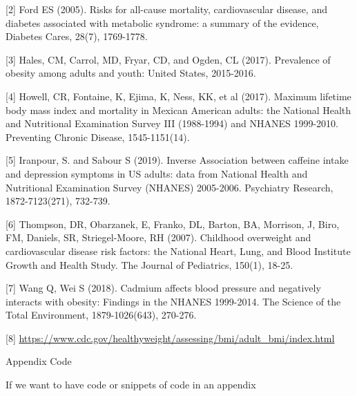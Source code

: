 \documentclass[12pt]{article}
\numberwithin{figure}{section}
\begin{document}
[2] Ford ES (2005). Risks for all-cause mortality, cardiovascular disease, and diabetes associated with metabolic syndrome: a summary of the evidence, Diabetes Cares, 28(7), 1769-1778.

[3] Hales, CM, Carrol, MD, Fryar, CD, and Ogden, CL (2017). Prevalence of obesity among adults and youth: United States, 2015-2016.

[4] Howell, CR, Fontaine, K, Ejima, K, Ness, KK, et al (2017). Maximum lifetime body mass index and mortality in Mexican American adults: the National Health and Nutritional Examination Survey III (1988-1994) and NHANES 1999-2010. Preventing Chronic Disease, 1545-1151(14).

[5] Iranpour, S. and Sabour S (2019). Inverse Association between caffeine intake and depression symptoms in US adults: data from National Health and Nutritional Examination Survey (NHANES) 2005-2006. Psychiatry Research, 1872-7123(271), 732-739.

[6] Thompson, DR, Obarzanek, E, Franko, DL, Barton, BA, Morrison, J, Biro, FM, Daniels, SR, Striegel-Moore, RH (2007).  Childhood overweight and cardiovascular disease risk factors: the National Heart, Lung, and Blood Institute Growth and Health Study. The Journal of Pediatrics, 150(1), 18-25. 

[7] Wang Q, Wei S (2018). Cadmium affects blood pressure and negatively interacts with obesity: Findings in the NHANES 1999-2014. The Science of the Total Environment, 1879-1026(643), 270-276.

[8] \url{https://www.cdc.gov/healthyweight/assessing/bmi/adult_bmi/index.html}



\newpage
{\sf Appendix Code}

\small{
If we want to have code or snippets of code in an appendix
}
\end{document}
